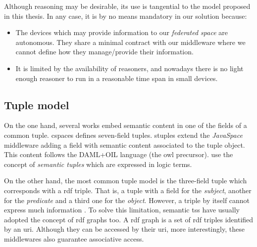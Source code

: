 Although reasoning may be desirable, its use is tangential to the model proposed in this thesis.
In any case, it is by no means mandatory in our solution because:
\begin{itemize}
  \item The devices which may provide information to our \emph{federated space} are autonomous.
	They share a minimal contract with our middleware where we cannot define how they manage/provide their information.
  \item It is limited by the availability of reasoners, and nowadays there is no light enough reasoner to run in a reasonable time span in small devices.
\end{itemize}




\subsection{Tuple model}

On the one hand, several works embed semantic content in one of the fields of a common tuple.
\ac{cspaces} \citep{martinrecuerda_towards_2005} defines seven-field tuples.
\ac{stuples} \citep{khushraj_stuples:_2004} extend the \emph{JavaSpace} \citep{freeman_javaspaces_1999} middleware adding a field with semantic content associated to the tuple object.
This content follows the DAML+OIL language (the \ac{owl} precursor).
\citet{nardini_semantic_2013} use the concept of \emph{semantic tuples} which are expressed in logic terms.


On the other hand, the most common tuple model is the three-field tuple which corresponds with a \ac{rdf} triple.
That is, a tuple with a field for the \emph{subject}, another for the \emph{predicate} and a third one for the \emph{object}.
However, a triple by itself cannot express much information \citep{krummenacher2006specification}.
To solve this limitation, semantic \acp{ts} have usually adopted the concept of \ac{rdf} graphs too.
A \ac{rdf} graph is a set of \ac{rdf} triples identified by an \ac{uri}. %
Although they can be accessed by their \ac{uri}, more interestingly, these middlewares also guarantee associative access. %


